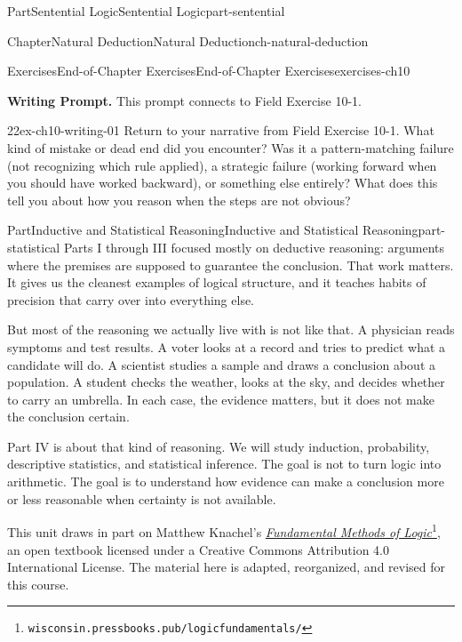 \documentclass[oneside,10pt,]{book}
\begin{document}
\begin{partptx}{Part}{Sentential Logic}{}{Sentential Logic}{}{}{part-sentential}
\begin{chapterptx}{Chapter}{Natural Deduction}{}{Natural Deduction}{}{}{ch-natural-deduction}
\begin{exercises-section}{Exercises}{End-of-Chapter Exercises}{}{End-of-Chapter Exercises}{}{}{exercises-ch10}
\par\medskip\noindent%
\textbf{Writing Prompt.}\space\space\hypertarget{exgroup-ch10-writing}{}%
This prompt connects to Field Exercise 10-1.%
\begin{exercisegroup}
\begin{divisionexerciseeg}{22}{}{}{ex-ch10-writing-01}%
Return to your narrative from Field Exercise 10-1. What kind of mistake or dead end did you encounter? Was it a pattern-matching failure (not recognizing which rule applied), a strategic failure (working forward when you should have worked backward), or something else entirely? What does this tell you about how you reason when the steps are not obvious?%
\end{divisionexerciseeg}%
\end{exercisegroup}
\par\medskip\noindent
\end{exercises-section}
\end{chapterptx}
\end{partptx}
%
%
\typeout{************************************************}
\typeout{************************************************}
%
\begin{partptx}{Part}{Inductive and Statistical Reasoning}{}{Inductive and Statistical Reasoning}{}{}{part-statistical}
\renewcommand*{\partname}{Part}
Parts I through III focused mostly on deductive reasoning: arguments where the premises are supposed to guarantee the conclusion. That work matters. It gives us the cleanest examples of logical structure, and it teaches habits of precision that carry over into everything else.%
 \par
But most of the reasoning we actually live with is not like that. A physician reads symptoms and test results. A voter looks at a record and tries to predict what a candidate will do. A scientist studies a sample and draws a conclusion about a population. A student checks the weather, looks at the sky, and decides whether to carry an umbrella. In each case, the evidence matters, but it does not make the conclusion certain.%
 \par
Part IV is about that kind of reasoning. We will study induction, probability, descriptive statistics, and statistical inference. The goal is not to turn logic into arithmetic. The goal is to understand how evidence can make a conclusion more or less reasonable when certainty is not available.%
 \par
This unit draws in part on Matthew Knachel's \href{https://wisconsin.pressbooks.pub/logicfundamentals/}{\emph{Fundamental Methods of Logic}}\footnote{\nolinkurl{wisconsin.pressbooks.pub/logicfundamentals/}\label{part-statistical-intro-4-2}}, an open textbook licensed under a Creative Commons Attribution 4.0 International License. The material here is adapted, reorganized, and revised for this course.%
\end{partptx}
%
\appendix%
%
\end{document}

